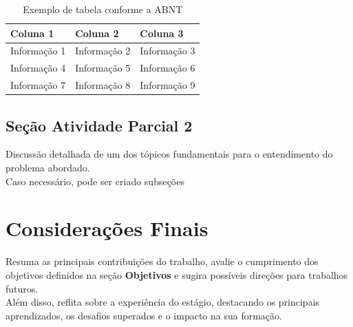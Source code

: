 \begin{table}[ht]
    \centering
    \caption{Exemplo de tabela conforme a ABNT}
    \label{quad:exemplo}
    \begin{tabular}{p{3cm} p{4cm} p{3cm}}
        \hline%
        \textbf{Coluna 1} & \textbf{Coluna 2} & \textbf{Coluna 3} \\
        \hline%
        Informação 1 & Informação 2 & Informação 3 \\
        Informação 4 & Informação 5 & Informação 6 \\
        Informação 7 & Informação 8 & Informação 9 \\
        \hline%
    \end{tabular}
\end{table}



\subsection{ Seção Atividade Parcial 2} \label{sec:definir-tituto-da-secao2}

Discussão detalhada de um dos tópicos fundamentais para o entendimento do problema abordado. \\ Caso necessário, pode ser criado subseções


\section{Considerações Finais} \label{ch:consideracoes-finais}
Resuma as principais contribuições do trabalho, avalie o cumprimento dos objetivos definidos na seção \textbf{Objetivos} e sugira possíveis direções para trabalhos futuros.\\
Além disso, reflita sobre a experiência do estágio, destacando os principais aprendizados, os desafios superados e o impacto na sua formação. 
